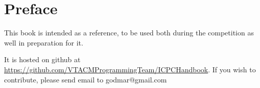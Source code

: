 \chapter{Preface}

This book is intended as a reference, to be used both during the competition as well
in preparation for it.

It is hosted on github at
\href{https://github.com/VTACMProgrammingTeam/ICPCHandbook}{https://github.com/VTACMProgrammingTeam/ICPCHandbook}.
If you wish to contribute, please send email to godmar@gmail.com

